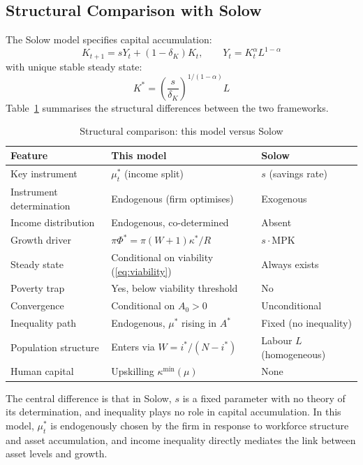 \documentclass[12pt,a4paper]{article}
\begin{document}
\subsection{Structural Comparison with Solow}

The Solow model specifies capital accumulation:
\begin{equation}
  K_{t+1} = sY_t + (1-\delta_K)K_t, \qquad Y_t = K_t^\alpha L^{1-\alpha}
  \label{eq:solow}
\end{equation}
with unique stable steady state:
\begin{equation}
  K^* = \left(\frac{s}{\delta_K}\right)^{1/(1-\alpha)} L
  \label{eq:solow_kstar}
\end{equation}
Table~\ref{tab:solow_compare} summarises the structural differences
between the two frameworks.

\begin{table}[h!]
\centering
\caption{Structural comparison: this model versus Solow}
\label{tab:solow_compare}
\begin{tabular}{lll}
\toprule
Feature & This model & Solow \\
\midrule
Key instrument & $\mu_t^*$ (income split) & $s$ (savings rate) \\
Instrument determination & Endogenous (firm optimises) & Exogenous \\
Income distribution & Endogenous, co-determined & Absent \\
Growth driver & $\pi\Phi^* = \pi(W+1)\kappa^*/R$ & $s \cdot \mathrm{MPK}$ \\
Steady state & Conditional on viability (\ref{eq:viability}) & Always exists \\
Poverty trap & Yes, below viability threshold & No \\
Convergence & Conditional on $A_0 > 0$ & Unconditional \\
Inequality path & Endogenous, $\mu^*$ rising in $A^*$ & Fixed (no inequality) \\
Population structure & Enters via $W = i^*/(N-i^*)$ & Labour $L$ (homogeneous) \\
Human capital & Upskilling $\kappa^{\min}(\mu)$ & None \\
\bottomrule
\end{tabular}
\end{table}

The central difference is that in Solow, $s$ is a fixed parameter
with no theory of its determination, and inequality plays no role
in capital accumulation. In this model, $\mu_t^*$ is endogenously
chosen by the firm in response to workforce structure and asset
accumulation, and income inequality directly mediates the link
between asset levels and growth.
\end{document}
